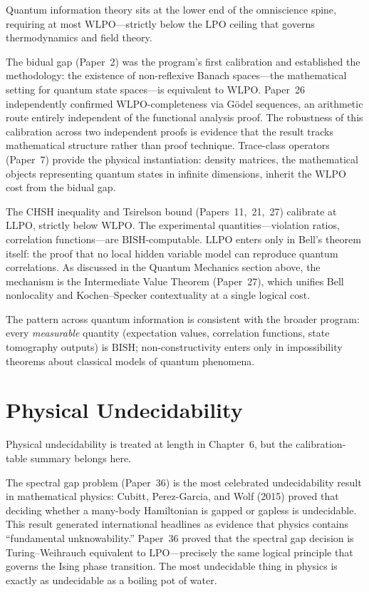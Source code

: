 \documentclass[11pt,a4paper]{report}
\theoremstyle{plain}
\theoremstyle{definition}
\theoremstyle{remark}
\newcommand{\BISH}{\mathrm{BISH}}
\newcommand{\LLPO}{\mathrm{LLPO}}
\newcommand{\WLPO}{\mathrm{WLPO}}
\newcommand{\LPO}{\mathrm{LPO}}
\begin{document}
Quantum information theory sits at the lower end of the omniscience spine, requiring at most $\WLPO$---strictly below the $\LPO$ ceiling that governs thermodynamics and field theory.

The bidual gap (Paper~2) was the program's first calibration and established the methodology: the existence of non-reflexive Banach spaces---the mathematical setting for quantum state spaces---is equivalent to $\WLPO$.  Paper~26 independently confirmed $\WLPO$-completeness via G\"odel sequences, an arithmetic route entirely independent of the functional analysis proof.  The robustness of this calibration across two independent proofs is evidence that the result tracks mathematical structure rather than proof technique.  Trace-class operators (Paper~7) provide the physical instantiation: density matrices, the mathematical objects representing quantum states in infinite dimensions, inherit the $\WLPO$ cost from the bidual gap.

The CHSH inequality and Tsirelson bound (Papers~11,~21,~27) calibrate at $\LLPO$, strictly below $\WLPO$.  The experimental quantities---violation ratios, correlation functions---are $\BISH$-computable.  $\LLPO$ enters only in Bell's theorem itself: the proof that no local hidden variable model can reproduce quantum correlations.  As discussed in the Quantum Mechanics section above, the mechanism is the Intermediate Value Theorem (Paper~27), which unifies Bell nonlocality and Kochen--Specker contextuality at a single logical cost.

The pattern across quantum information is consistent with the broader program: every \emph{measurable} quantity (expectation values, correlation functions, state tomography outputs) is $\BISH$; non-constructivity enters only in impossibility theorems about classical models of quantum phenomena.

\section{Physical Undecidability}

Physical undecidability is treated at length in Chapter~6, but the calibration-table summary belongs here.

The spectral gap problem (Paper~36) is the most celebrated undecidability result in mathematical physics: Cubitt, Perez-Garcia, and Wolf (2015) proved that deciding whether a many-body Hamiltonian is gapped or gapless is undecidable.  This result generated international headlines as evidence that physics contains ``fundamental unknowability.''  Paper~36 proved that the spectral gap decision is Turing--Weihrauch equivalent to $\LPO$---precisely the same logical principle that governs the Ising phase transition.  The most undecidable thing in physics is exactly as undecidable as a boiling pot of water.
\end{document}

